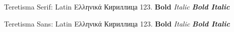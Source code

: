 \documentclass{article}
\begin{document}
Teretisma Serif: Latin Ελληνικά Кириллица 123. \textbf{Bold} \textit{Italic} \textbf{\textit{Bold Italic}}

\sffamily Teretisma Sans: Latin Ελληνικά Кириллица 123. \textbf{Bold} \textit{Italic} \textbf{\textit{Bold Italic}}
\end{document}

